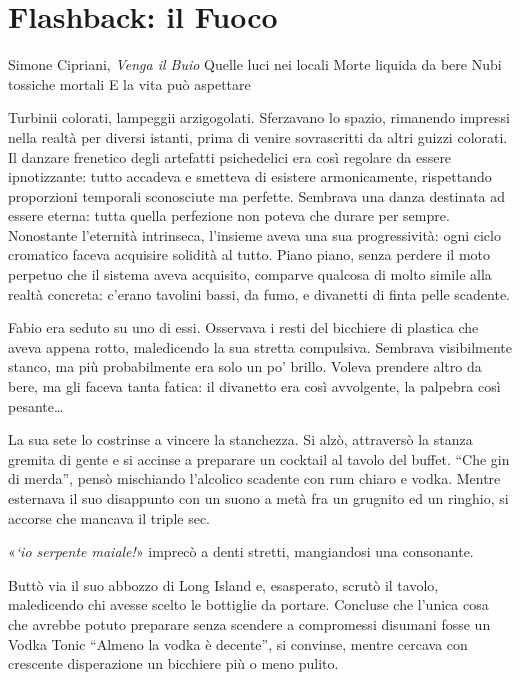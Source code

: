 \chapter{Flashback: il Fuoco}

\begin{chapquote}{Simone Cipriani, \textit{Venga il Buio}}
	Quelle luci nei locali\newline
	Morte liquida da bere\newline
	Nubi tossiche mortali\newline
	E la vita può aspettare
\end{chapquote}


Turbinii colorati, lampeggii arzigogolati. Sferzavano lo spazio, rimanendo impressi nella realtà per diversi istanti, prima di venire sovrascritti da altri guizzi colorati. Il danzare frenetico degli artefatti psichedelici era così regolare da essere ipnotizzante: tutto accadeva e smetteva di esistere armonicamente, rispettando proporzioni temporali sconosciute ma perfette. Sembrava una danza destinata ad essere eterna: tutta quella perfezione non poteva che durare per sempre. Nonostante l'eternità intrinseca, l'insieme aveva una sua progressività: ogni ciclo cromatico faceva acquisire solidità al tutto. Piano piano, senza perdere il moto perpetuo che il sistema aveva acquisito, comparve qualcosa di molto simile alla realtà concreta: c'erano tavolini bassi, da fumo, e divanetti di finta pelle scadente.

Fabio era seduto su uno di essi. Osservava i resti del bicchiere di plastica che aveva appena rotto, maledicendo la sua stretta compulsiva. Sembrava visibilmente stanco, ma più probabilmente era solo un po' brillo. Voleva prendere altro da bere, ma gli faceva tanta fatica: il divanetto era così avvolgente, la palpebra così pesante\ldots

La sua sete lo costrinse a vincere la stanchezza. Si alzò, attraversò la stanza gremita di gente e si accinse a preparare un cocktail al tavolo del buffet. ``Che gin di merda'', pensò mischiando l'alcolico scadente con rum chiaro e vodka. Mentre esternava il suo disappunto con un suono a metà fra un grugnito ed un ringhio, si accorse che mancava il triple sec.

«\textit{`io serpente maiale!}» imprecò a denti stretti, mangiandosi una consonante.

Buttò via il suo abbozzo di Long Island e, esasperato, scrutò il tavolo, maledicendo chi avesse scelto le bottiglie da portare. Concluse che l'unica cosa che avrebbe potuto preparare senza scendere a compromessi disumani fosse un Vodka Tonic  ``Almeno la vodka è decente'', si convinse, mentre cercava con crescente disperazione un bicchiere più o meno pulito.

